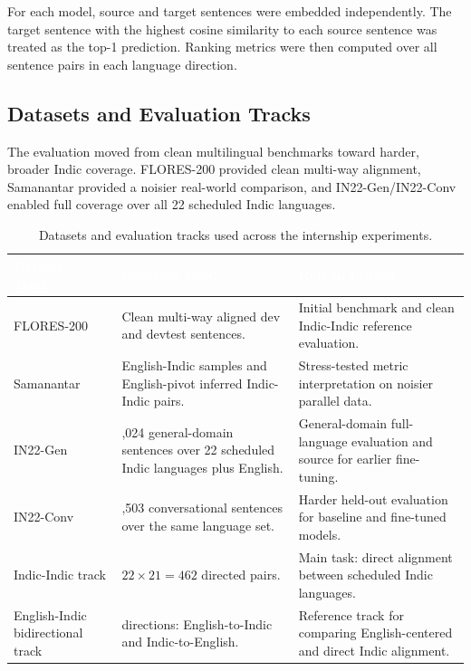 \documentclass[12pt, a4paper]{article}
\begin{document}
For each model, source and target sentences were embedded independently. The target sentence with the highest cosine similarity to each source sentence was treated as the top-1 prediction. Ranking metrics were then computed over all sentence pairs in each language direction.

\subsection{Datasets and Evaluation Tracks}

The evaluation moved from clean multilingual benchmarks toward harder, broader Indic coverage. FLORES-200 provided clean multi-way alignment, Samanantar provided a noisier real-world comparison, and IN22-Gen/IN22-Conv enabled full coverage over all 22 scheduled Indic languages.

\begin{table}[H]
\centering
\footnotesize
\renewcommand{\arraystretch}{1.2}
\begin{tabular}{>{\raggedright\arraybackslash}p{3.1cm} >{\raggedright\arraybackslash}p{4.8cm} >{\raggedright\arraybackslash}p{5.0cm}}
\toprule
\rowcolor{headerblue}
\textcolor{white}{\textbf{Dataset / Track}} &
\textcolor{white}{\textbf{Coverage Used}} &
\textcolor{white}{\textbf{Role in Project}} \\
\midrule
\rowcolor{rowgray}
FLORES-200 & Clean multi-way aligned dev and devtest sentences. & Initial benchmark and clean Indic-Indic reference evaluation. \\
Samanantar & English-Indic samples and English-pivot inferred Indic-Indic pairs. & Stress-tested metric interpretation on noisier parallel data. \\
\rowcolor{rowgray}
IN22-Gen & 1,024 general-domain sentences over 22 scheduled Indic languages plus English. & General-domain full-language evaluation and source for earlier fine-tuning. \\
IN22-Conv & 1,503 conversational sentences over the same language set. & Harder held-out evaluation for baseline and fine-tuned models. \\
\rowcolor{rowgray}
Indic-Indic track & $22 \times 21 = 462$ directed pairs. & Main task: direct alignment between scheduled Indic languages. \\
English-Indic bidirectional track & 44 directions: English-to-Indic and Indic-to-English. & Reference track for comparing English-centered and direct Indic alignment. \\
\bottomrule
\end{tabular}
\caption{Datasets and evaluation tracks used across the internship experiments.}
\label{tab:datasets_tracks}
\end{table}
\end{document}
